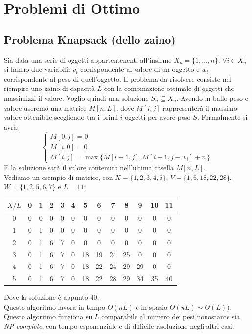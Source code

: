\documentclass[a4paper,12pt, oneside]{book}
\begin{document}
\section{Problemi di Ottimo}
\subsection{Problema Knapsack (dello zaino)}
Sia data una serie di oggetti appartentenenti all'insieme
$X_n=\{1,\ldots, n\}$. $\forall i \in X_n$ si hanno due variabili:
$v_i$ corrispondente al valore di un oggetto e $w_i$ corrispondente al
peso di quell'oggetto. Il problema da risolvere consiste nel riempire
uno zaino di capacità $L$ con la combinazione ottimale di oggetti che
massimizzi il valore. Voglio quindi una soluzione $S_n\subseteq X_n$.
Avendo in ballo peso e valore useremo una matrice $M[n,L]$, dove
$M[i,j]$ rappresenterà il massimo valore ottenibile scegliendo tra i
primi $i$ oggetti per avere peso $S$. Formalmente si avrà:
\[
  \begin{cases}
    M[0,j]=0\\
    M[i,0]=0\\
    M[i,j]=\max\{M[i-1,j], M[i-1, j-w_i]+v_i\}
  \end{cases}
\]
E la soluzione sarà il valore contenuto nell'ultima casella
$M[n,L]$.\\
Vediamo un esempio di matrice, con $X=\{1,2,3,4,5\}$, $V=\{1,6,18,22,28\}$,
$W=\{1,2,5,6,7\}$ e $L=11$:
\begin{center}
  \begin{tabular}{c|cccccccccccc}
    $X/L$ & 0 & 1 & 2 & 3 & 4 & 5 & 6 & 7 & 8 & 9 & 10 & 11\\
    \hline
    0 & 0 & 0 & 0 & 0 & 0 & 0 & 0 & 0 & 0 & 0 & 0 & 0\\
    1 & 0 & 1 & 0 & 0 & 0 & 0 & 0 & 0 & 0 & 0 & 0 & 0\\
    2 & 0 & 1 & 6 & 7 & 0 & 0 & 0 & 0 & 0 & 0 & 0 & 0\\
    3 & 0 & 1 & 6 & 7 & 0 & 18 & 19 & 24 & 25 & 0 & 0 & 0\\
    4 & 0 & 1 & 6 & 7 & 0 & 18 & 22 & 24 & 29 & 29 & 0 & 0\\
    5 & 0 & 1 & 6 & 7 & 0 & 18 & 22 & 28 & 29 & 34 & 35 & 40\\
  \end{tabular}
\end{center}
Dove la soluzione è appunto 40.\\
Questo algoritmo lavora in tempo $\Theta(nL)$ e in spazio
$\Theta(nL)\sim \Theta(L))$. Questo algoritmo funziona su $L$
comparabile al numero dei pesi nonostante sia
\textit{NP-complete}, con tempo esponenziale e di difficile
risoluzione negli altri casi.
\end{document}
